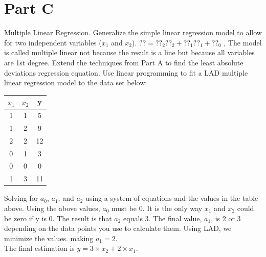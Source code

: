 \section{Part C}
Multiple Linear Regression. Generalize the simple linear regression model to allow for two independent variables ($x_{1}$ and $x_{2}$).
$?? = ??_{2} ??_{2} + ??_{1} ??_{1} + ??_{0}$ ,
The model is called multiple linear not because the result is a line but because all variables are 1st degree. Extend the techniques from Part A to find the least absolute deviations regression equation. Use linear programming to fit a LAD multiple linear regression model to the data set below:
\begin{table}[ht]
\centering
\begin{tabular}{| c | c | c |}
\hline
$x_{1}$ & $x_{2}$ & y \\ [0.5ex] %
\hline
1 & 1 & 5 \\
1 & 2 & 9  \\
2 & 2 & 12 \\
0 & 1 & 3  \\
0 & 0 & 0  \\
1 & 3 & 11 \\ [1ex]
\hline
\end{tabular}
\end{table}

Solving for $a_{0}$, $a_{1}$, and $a_{2}$ using a system of equations and the values in the table above. Using the above values, $a_{0}$ must be 0. It is the only way $x_{1}$ and $x_{2}$ could be zero if y is 0. The result is that $a_{2}$ equals 3. The final value, $a_{1}$, is 2 or 3 depending on the data points you use to calculate them.  Using LAD, we minimize the values. making $a_{1} = 2$.
\\
The final estimation is $y = 3\times x_{2} + 2\times x_{1}$.
